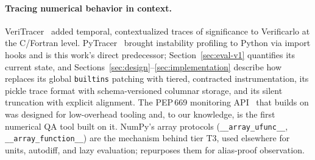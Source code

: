 \paragraph{Tracing numerical behavior in context.}
VeriTracer~\citep{chatelain2019veritracer} added temporal, contextualized
traces of significance to Verificarlo at the C/Fortran level.
PyTracer~\citep{chatelain2023pytracer} brought instability profiling to
Python via import hooks and is this work's direct predecessor;
Section~\ref{sec:eval-v1} quantifies its current state, and
Sections~\ref{sec:design}--\ref{sec:implementation} describe how \pyt{}
replaces its global \texttt{builtins} patching with tiered, contracted
instrumentation, its pickle trace format with schema-versioned columnar
storage, and its silent truncation with explicit alignment. The PEP\,669
monitoring API~\citep{pep669} that \pyt{} builds on was designed for
low-overhead tooling and, to our knowledge, \pyt{} is the first numerical
QA tool built on it. NumPy's array protocols
(\texttt{\_\_array\_ufunc\_\_}, \texttt{\_\_array\_function\_\_})
\citep{harris2020numpy} are the mechanism behind tier T3, used elsewhere
for units, autodiff, and lazy evaluation; \pyt{} repurposes them for
alias-proof observation.

